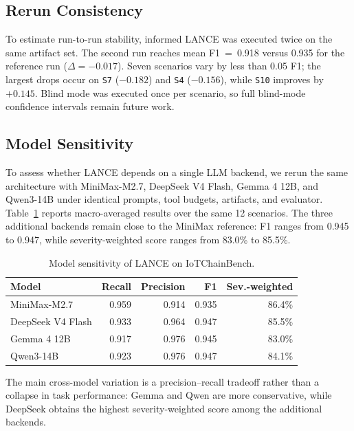 \documentclass[conference,compsoc]{IEEEtran}
\newcommand{\systemname}{IoTChainBench\xspace}
\newcommand{\harnessname}{\textsc{LANCE}\xspace}
\begin{document}
\subsection{Rerun Consistency}
\label{sec:eval:consistency}

To estimate run-to-run stability, informed \harnessname{} was executed twice on the same artifact set. The second run reaches mean F1~=~0.918 versus 0.935 for the reference run ($\Delta=-0.017$). Seven scenarios vary by less than 0.05 F1; the largest drops occur on \texttt{S7} ($-0.182$) and \texttt{S4} ($-0.156$), while \texttt{S10} improves by $+0.145$. Blind mode was executed once per scenario, so full blind-mode confidence intervals remain future work.

\subsection{Model Sensitivity}
\label{sec:eval:model-sensitivity}

To assess whether \harnessname{} depends on a single LLM backend, we rerun the same architecture with MiniMax-M2.7, DeepSeek V4 Flash, Gemma 4 12B, and Qwen3-14B under identical prompts, tool budgets, artifacts, and evaluator. Table~\ref{tab:model-sensitivity} reports macro-averaged results over the same 12 scenarios. The three additional backends remain close to the MiniMax reference: F1 ranges from 0.945 to 0.947, while severity-weighted score ranges from 83.0\% to 85.5\%.

\begin{table}[h!]
\centering
\caption{\footnotesize Model sensitivity of \harnessname{} on \systemname{}.}
\label{tab:model-sensitivity}
\scriptsize
\setlength{\tabcolsep}{4pt}
\begin{tabular}{@{}lrrrr@{}}
\toprule
Model & Recall & Precision & F1 & Sev.-weighted \\
\midrule
MiniMax-M2.7       & 0.959 & 0.914 & 0.935 & 86.4\% \\
DeepSeek V4 Flash  & 0.933 & 0.964 & 0.947 & 85.5\% \\
Gemma 4 12B        & 0.917 & 0.976 & 0.945 & 83.0\% \\
Qwen3-14B          & 0.923 & 0.976 & 0.947 & 84.1\% \\
\bottomrule
\end{tabular}
\end{table}

The main cross-model variation is a precision--recall tradeoff rather than a collapse in task performance: Gemma and Qwen are more conservative, while DeepSeek obtains the highest severity-weighted score among the additional backends.
\end{document}
